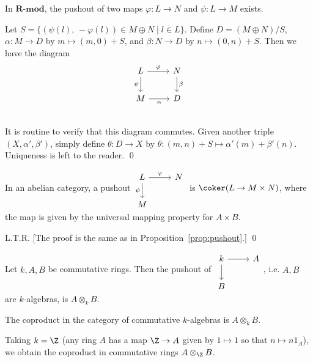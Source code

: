 \begin{prop} \label{prop:pushout}
In $\textbf{R-mod}$, the pushout of two maps $\varphi: L \to N$ and $\psi: L \to M$ exists. 
\end{prop}

\pf Let $S=\{(\psi(l), \,-\varphi(l)) \in M \oplus N \;|\; l \in L \}$. Define $D=(M \oplus N)/S$, $\alpha: M \to D$ by $m \mapsto (m,0)+S$, and $\beta: N \to D$ by $n \mapsto (0,n) + S$. Then we have the diagram
	\[
	\begin{tikzcd}
	L \arrow{r}{\varphi} \arrow[swap]{d}{\psi} & N \arrow{d}{\beta} \\
	M \arrow[swap]{r}{\alpha} & D   \\
	\end{tikzcd}
	\]
It is routine to verify that this diagram commutes. Given another triple $(X,\alpha',\beta')$, simply define $\theta: D \to X$ by $\theta: (m,n) +S \mapsto \alpha'(m)+\beta'(n)$. Uniqueness is left to the reader. \qed \\


\begin{prop}
In an abelian category, a pushout $\begin{tikzcd} L \arrow{r}{\varphi} \arrow[swap]{d}{\psi} & N \\ M & \end{tikzcd}$ is $\coker(L \to M \times N)$, where the map is given by the universal mapping property for $A \times B$. 
\end{prop}

\pf L.T.R. [The proof is the same as in Proposition~\ref{prop:pushout}.] \qed \\


\begin{ex}
Let $k,A,B$ be commutative rings. Then the pushout of $\begin{tikzcd} k \arrow{r} \arrow[swap]{d} & A \\ B & \end{tikzcd}$, i.e. $A,B$ are $k$-algebras, is $A \otimes_k B$. \xqed 
\end{ex}


\begin{cor}
The coproduct in the category of commutative $k$-algebras is $A \otimes_k B$. 
\end{cor}


\begin{rem}
Taking $k=\Z$ (any ring $A$ has a map $\Z \to A$ given by $1 \mapsto 1$ so that $n \mapsto n 1_A$), we obtain the coproduct in commutative rings $A \otimes_\Z B$. 
\end{rem}


